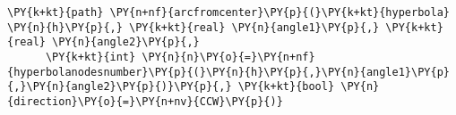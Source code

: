 \begin{Verbatim}[commandchars=\\\{\}]
      \PY{k+kt}{path} \PY{n+nf}{arcfromcenter}\PY{p}{(}\PY{k+kt}{hyperbola} \PY{n}{h}\PY{p}{,} \PY{k+kt}{real} \PY{n}{angle1}\PY{p}{,} \PY{k+kt}{real} \PY{n}{angle2}\PY{p}{,}
      \PY{k+kt}{int} \PY{n}{n}\PY{o}{=}\PY{n+nf}{hyperbolanodesnumber}\PY{p}{(}\PY{n}{h}\PY{p}{,}\PY{n}{angle1}\PY{p}{,}\PY{n}{angle2}\PY{p}{)}\PY{p}{,} \PY{k+kt}{bool} \PY{n}{direction}\PY{o}{=}\PY{n+nv}{CCW}\PY{p}{)}
\end{Verbatim}
